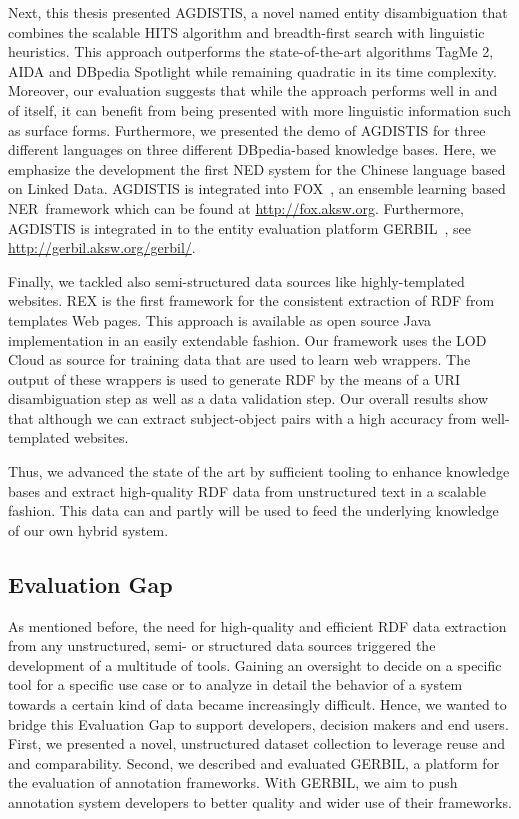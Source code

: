 Next, this thesis presented AGDISTIS, a novel named entity disambiguation that combines the scalable \ac{HITS} algorithm and breadth-first search with linguistic heuristics.
This approach outperforms the state-of-the-art algorithms TagMe 2, AIDA and DBpedia Spotlight while remaining quadratic in its time complexity. 
Moreover, our evaluation suggests that while the approach performs well in and of itself, it can benefit from being presented with more linguistic information such as surface forms. 
Furthermore, we presented the demo of AGDISTIS for three different languages on three different DBpedia-based knowledge bases.
Here,  we emphasize the development the first \ac{NED} system for the Chinese language based on Linked Data.
AGDISTIS is integrated into FOX~\cite{FOX}, an ensemble learning based \ac{NER}~framework which can be found at \url{http://fox.aksw.org}. 
Furthermore, AGDISTIS is integrated in to the entity evaluation platform GERBIL~\cite{GERBIL}, see \url{http://gerbil.aksw.org/gerbil/}.


Finally, we tackled also semi-structured data sources like highly-templated websites. 
REX is the first framework for the consistent extraction of \ac{RDF} from templates Web pages. 
This approach is available as open source Java implementation in an easily extendable fashion.
Our framework uses the \ac{LOD} Cloud as source for training data that are used to learn web wrappers. 
The output of these wrappers is used to generate \ac{RDF} by the means of a URI disambiguation step as well as a data validation step.
Our overall results show that although we can extract subject-object pairs with a high accuracy from well-templated websites.

Thus, we advanced the state of the art by sufficient tooling to enhance knowledge bases and extract high-quality RDF data from unstructured text in a scalable fashion. 
This data can and partly will be used to feed the underlying knowledge of our own hybrid  system. 


\subsection*{Evaluation Gap}

As mentioned before, the need for high-quality and efficient RDF data extraction from any unstructured, semi- or structured data sources triggered the development of a multitude of tools. 
Gaining an oversight to decide on a specific tool for a specific use case or to analyze in detail the behavior of  a system towards a certain kind of data became increasingly difficult.
Hence, we wanted to bridge this Evaluation Gap to  support developers, decision makers and end users.
First, we presented a novel, unstructured dataset collection to leverage reuse and and comparability. 
Second, we described and evaluated GERBIL, a platform for the evaluation of annotation frameworks. With GERBIL, we aim to push annotation system developers to better quality and wider use of their frameworks.

